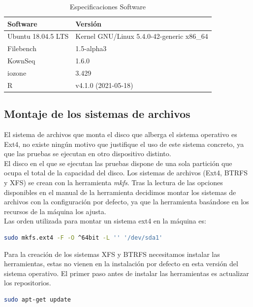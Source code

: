 \begin{table}[H]
    \centering
    \begin{tabular}{|l|l|}
    \hline
        Software & Versión \\ \hline\hline
        Ubuntu 18.04.5 LTS & Kernel GNU/Linux 5.4.0-42-generic x86\_64 \\ \hline
        Filebench & 1.5-alpha3 \\ \hline
        KownSeq & 1.6.0 \\ \hline
        iozone & 3.429 \\ \hline
        R & v4.1.0 (2021-05-18) \\ \hline
    \end{tabular}
    \caption{Especificaciones Software}
\label{table:2}
\end{table}

\subsection{Montaje de los sistemas de archivos}
El sistema de archivos que monta el disco que alberga el sistema operativo es Ext4, no existe ningún motivo que justifique el uso de este sistema concreto, ya que las pruebas se ejecutan en otro dispositivo distinto. \\

El disco en el que se ejecutan las pruebas dispone de una sola partición que ocupa el total de la capacidad del disco. Los sistemas de archivos (Ext4, BTRFS y XFS) se crean con la herramienta \textit{mkfs}. Tras la lectura de las opciones disponibles en el manual de la herramienta \cite{tso} decidimos montar los sistemas de archivos con la configuración por defecto, ya que la herramienta basándose en los recursos de la máquina los ajusta.\\

Las orden utilizada para montar un sistema ext4 en la máquina es:

\begin{lstlisting}[language=bash]
 sudo mkfs.ext4 -F -O ^64bit -L '' '/dev/sda1'
\end{lstlisting}

Para la creación de los sistemas XFS y BTRFS necesitamos instalar las herramientas, estas no vienen en la instalación por defecto en esta versión del sistema operativo. El primer paso antes de instalar las herramientas es actualizar los repositorios.
\begin{lstlisting}[language=bash]
sudo apt-get update
\end{lstlisting}

